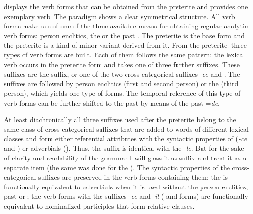  displays the verb forms that can be obtained from the preterite and  provides one exemplary verb. The paradigm shows a clear symmetrical structure. All verb forms make use of one of the three available means for obtaining regular analytic verb forms: person enclitics, the   or the past . The preterite is the base form and the preterite  is a kind of minor variant derived from it. From the preterite, three types of verb forms are built. Each of them follows the same pattern: the lexical verb occurs in the preterite form and takes one of three further suffixes. These suffixes are the  suffix, or one of the two cross-categorical suffixes \textit{-ce} and . The suffixes are followed by person enclitics (first and second person) or the  (third person), which yields one type of forms. The temporal reference of this type of verb forms can be further shifted to the past by means of the past  =\textit{de}. 

At least diachronically all three suffixes used after the preterite belong to the same class of cross-categorical suffixes that are added to words of different lexical classes and form either referential attributes with the syntactic properties of  (\textit{-ce} and ) or adverbials (). Thus, the  suffix is identical with the  -\textit{le}. But for the sake of clarity and readability of the grammar I will gloss it as  suffix and treat it as a separate item (the same was done for the ). The syntactic properties of the cross-categorical suffixes are preserved in the verb forms containing them: the  is functionally equivalent to adverbials when it is used without the person enclitics, past  or ; the verb forms with the suffixes -\textit{ce} and -\textit{il} ( and  forms) are functionally equivalent to nominalized participles that form relative clauses.



